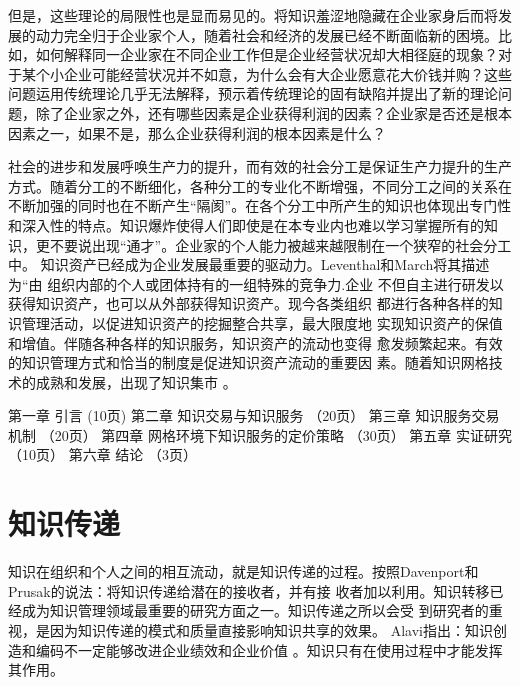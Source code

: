 \documentclass[12pt,a4paper]{ctexart}
\begin{document}
但是，这些理论的局限性也是显而易见的。将知识羞涩地隐藏在企业家身后而将发展的动力完全归于企业家个人，随着社会和经济的发展已经不断面临新的困境。比如，如何解释同一企业家在不同企业工作但是企业经营状况却大相径庭的现象？对于某个小企业可能经营状况并不如意，为什么会有大企业愿意花大价钱并购？这些问题运用传统理论几乎无法解释，预示着传统理论的固有缺陷并提出了新的理论问题，除了企业家之外，还有哪些因素是企业获得利润的因素？企业家是否还是根本因素之一，如果不是，那么企业获得利润的根本因素是什么？

社会的进步和发展呼唤生产力的提升，而有效的社会分工是保证生产力提升的生产方式。随着分工的不断细化，各种分工的专业化不断增强，不同分工之间的关系在不断加强的同时也在不断产生“隔阂”。在各个分工中所产生的知识也体现出专门性和深入性的特点。知识爆炸使得人们即使是在本专业内也难以学习掌握所有的知识，更不要说出现“通才”。企业家的个人能力被越来越限制在一个狭窄的社会分工中。
知识资产已经成为企业发展最重要的驱动力。Leventhal和March将其描述为“由
组织内部的个人或团体持有的一组特殊的竞争力\cite{levinthal1993ml}.企业
不但自主进行研发以获得知识资产，也可以从外部获得知识资产。现今各类组织
都进行各种各样的知识管理活动，以促进知识资产的挖掘整合共享，最大限度地
实现知识资产的保值和增值。伴随各种各样的知识服务，知识资产的流动也变得
愈发频繁起来。有效的知识管理方式和恰当的制度是促进知识资产流动的重要因
素。随着知识网格技术的成熟和发展，出现了知识集市 。\cite{Andreas2007}

第一章	引言 (10页)
第二章	知识交易与知识服务 （20页）
第三章	知识服务交易机制  （20页）
第四章	网格环境下知识服务的定价策略 （30页）
第五章	实证研究 （10页）
第六章	结论  （3页）

\section{知识传递}
知识在组织和个人之间的相互流动，就是知识传递的过程。按照Davenport和
Prusak\cite{davenport1998wko}的说法：将知识传递给潜在的接收者，并有接
收者加以利用。知识转移已经成为知识管理领域最重要的研究方面之一。知识传递之所以会受
到研究者的重视，是因为知识传递的模式和质量直接影响知识共享的效果。
Alavi指出：知识创造和编码不一定能够改进企业绩效和企业价值
\cite{alavi2000mok}。知识只有在使用过程中才能发挥其作用。
\end{document}
